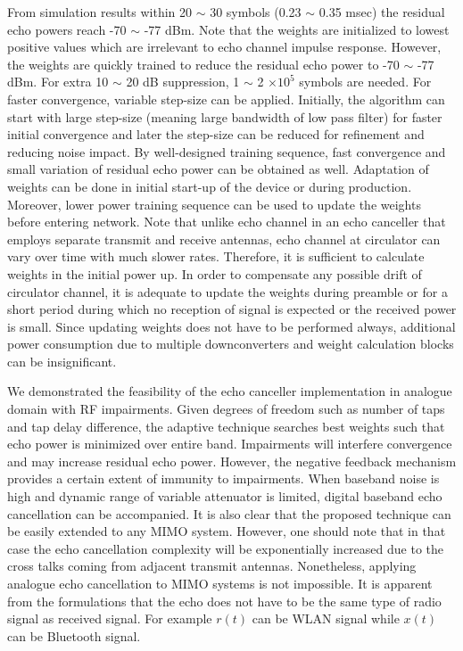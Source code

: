 \documentclass[twocolumn]{IEEEtran}
\begin{document}
From simulation results within 20 $\sim$ 30 symbols (0.23 $\sim$
0.35 msec) the residual echo powers reach -70 $\sim$ -77 dBm. Note
that the weights are initialized to lowest positive values which are
irrelevant to echo channel impulse response. However, the weights
are quickly trained to reduce the residual echo power to -70 $\sim$
-77 dBm. For extra 10 $\sim$ 20 dB suppression, 1 $\sim$ 2 $\times
10^5$ symbols are needed. For faster convergence, variable step-size
can be applied. Initially, the algorithm can start with large
step-size (meaning large bandwidth of low pass filter) for faster
initial convergence and later the step-size can be reduced for
refinement and reducing noise impact. By well-designed training
sequence, fast convergence and small variation of residual echo
power can be obtained as well. Adaptation of weights can be done in
initial start-up of the device or during production. Moreover, lower
power training sequence can be used to update the weights before
entering network. Note that unlike echo channel in an echo canceller
that employs separate transmit and receive antennas, echo channel at
circulator can vary over time with much slower rates. Therefore, it
is sufficient to calculate weights in the initial power up. In order
to compensate any possible drift of circulator channel, it is
adequate to update the weights during preamble or for a short period
during which no reception of signal is expected or the received
power is small. Since updating weights does not have to be performed
always, additional power consumption due to multiple downconverters
and weight calculation blocks can be insignificant.

We demonstrated the feasibility of the echo canceller implementation
in analogue domain with RF impairments. Given degrees of freedom
such as number of taps and tap delay difference, the adaptive
technique searches best weights such that echo power is minimized
over entire band. Impairments will interfere convergence and may
increase residual echo power. However, the negative feedback
mechanism provides a certain extent of immunity to impairments. When
baseband noise is high and dynamic range of variable attenuator is
limited, digital baseband echo cancellation can be accompanied. It
is also clear that the proposed technique can be easily extended to
any MIMO system. However, one should note that in that case the echo
cancellation complexity will be exponentially increased due to the
cross talks coming from adjacent transmit antennas. Nonetheless,
applying analogue echo cancellation to MIMO systems is not
impossible. It is apparent from the formulations that the echo does
not have to be the same type of radio signal as received signal. For
example $r(t)$ can be WLAN signal while $x(t)$ can be Bluetooth
signal.
\end{document}
